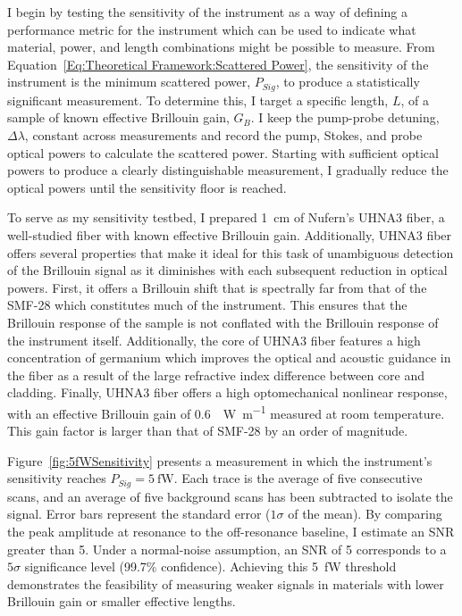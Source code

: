 \FloatBarrier

I begin by testing the sensitivity of the instrument as a way of defining a performance metric for the instrument which can be used to indicate what material, power, and length combinations might be possible to measure. From Equation~\ref{Eq:Theoretical Framework:Scattered Power}, the sensitivity of the instrument is the minimum scattered power, \(P_{Sig}\), to produce a statistically significant measurement. To determine this, I target a specific length, \(L\), of a sample of known effective Brillouin gain, \(G_B\). I keep the pump-probe detuning, \(\Delta\lambda\), constant across measurements and record the pump, Stokes, and probe optical powers to calculate the scattered power. Starting with sufficient optical powers to produce a clearly distinguishable measurement, I gradually reduce the optical powers until the sensitivity floor is reached.

To serve as my sensitivity testbed, I prepared \SI{1}{\centi\meter} of Nufern's \ac{UHNA3} fiber, a well-studied fiber with known effective Brillouin gain\cite{behunin2015long}. Additionally, \ac{UHNA3} fiber offers several properties that make it ideal for this task of unambiguous detection of the Brillouin signal as it diminishes with each subsequent reduction in optical powers. First, it offers a Brillouin shift that is spectrally far from that of the \ac{SMF-28} which constitutes much of the instrument. This ensures that the Brillouin response of the sample is not conflated with the Brillouin response of the instrument itself. Additionally, the core of \ac{UHNA3} fiber features a high concentration of germanium which improves the optical and acoustic guidance in the fiber as a result of the large refractive index difference between core and cladding. Finally, \ac{UHNA3} fiber offers a high optomechanical nonlinear response, with an effective Brillouin gain of \SI{0.6}{\per\watt\per\meter} measured at room temperature\cite{behunin2015long}. This gain factor is larger than that of \ac{SMF-28} by an order of magnitude\cite{nikles1997brillouin}.

Figure~\ref{fig:5fWSensitivity} presents a measurement in which the instrument’s sensitivity reaches \(P_{Sig}\!= \SI{5}{\femto\watt}\). Each trace is the average of five consecutive scans, and an average of five background scans has been subtracted to isolate the signal. Error bars represent the standard error (\(1\sigma\) of the mean). By comparing the peak amplitude at resonance to the off-resonance baseline, I estimate an \ac{SNR} greater than 5. Under a normal-noise assumption, an \ac{SNR} of 5 corresponds to a \(5\sigma\) significance level (99.7\% confidence). Achieving this \SI{5}{\femto\watt} threshold demonstrates the feasibility of measuring weaker signals in materials with lower Brillouin gain or smaller effective lengths.

